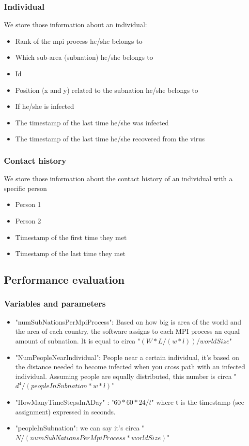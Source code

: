 \documentclass[table, 12pt]{article}
\begin{document}
\subsubsection{Individual}
We store those information about an individual: 
\begin{itemize}
\setlength\itemsep{-0.5em}
\item Rank of the mpi process he/she belongs to
\item Which sub-area (subnation) he/she belongs to
\item Id
\item Position (x and y) related to the subnation he/she belongs to 
\item If he/she is infected
\item The timestamp of the last time he/she was infected
\item The timestamp of the last time he/she recovered from the virus
\end{itemize}

\subsubsection{Contact history}
We store those information about the contact history of an individual with a specific person
\begin{itemize}
\setlength\itemsep{-0.5em}
\item Person 1
\item Person 2
\item Timestamp of the first time they met
\item Timestamp of the last time they met
\end{itemize}

\subsection{Performance evaluation}

\subsubsection{Variables and parameters}
\begin{flushleft}
\begin{itemize}
\setlength\itemsep{-0.5em}
\item "numSubNationsPerMpiProcess": Based on how big is area of the world and the area of each country, the software assigns to each MPI process an equal amount of subnation. It is equal to circa "$ (W*L/(w*l)) / worldSize $"
\item "NumPeopleNearIndividual": People near a certain individual, it's based on the distance needed to become infected when you cross path with an infected individual. Assuming people are equally distributed, this number is circa "$ d^4 / (peopleInSubnation * w*l) $"
\item "HowManyTimeStepsInADay" : "$ 60 * 60 * 24 / t $" where t is the timestamp (see assignment) expressed in seconds.
\item "peopleInSubnation": we can say it's circa "$ N/(numSubNationsPerMpiProcess * worldSize) $"
\end{itemize}
\end{flushleft}
\end{document}
